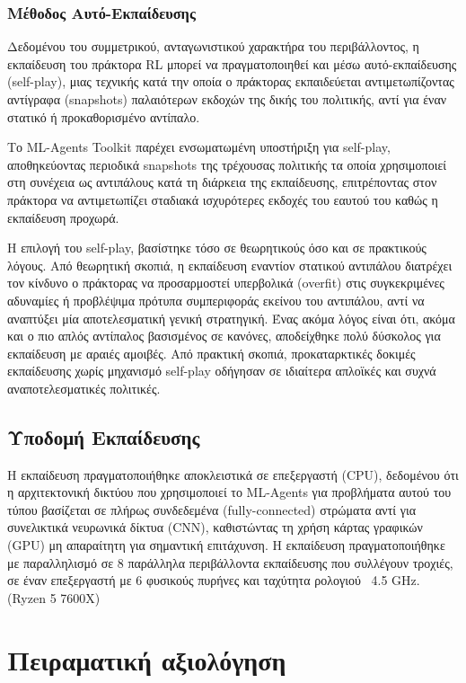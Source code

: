 \documentclass[12pt]{article}
\begin{document}
\subsubsection{Μέθοδος Αυτό-Εκπαίδευσης}
Δεδομένου του συμμετρικού, ανταγωνιστικού χαρακτήρα του περιβάλλοντος, η εκπαίδευση του πράκτορα RL μπορεί να πραγματοποιηθεί και μέσω αυτό-εκπαίδευσης (self-play), μιας τεχνικής κατά την οποία ο πράκτορας εκπαιδεύεται αντιμετωπίζοντας αντίγραφα (snapshots) παλαιότερων εκδοχών της δικής του πολιτικής, αντί για έναν στατικό ή προκαθορισμένο αντίπαλο. 

Το ML-Agents Toolkit παρέχει ενσωματωμένη υποστήριξη για self-play, αποθηκεύοντας περιοδικά snapshots της τρέχουσας πολιτικής τα οποία χρησιμοποιεί στη συνέχεια ως αντιπάλους κατά τη διάρκεια της εκπαίδευσης, επιτρέποντας στον πράκτορα να αντιμετωπίζει σταδιακά ισχυρότερες εκδοχές του εαυτού του καθώς η εκπαίδευση προχωρά.

Η επιλογή του self-play, βασίστηκε τόσο σε θεωρητικούς όσο και σε πρακτικούς λόγους. Από θεωρητική σκοπιά, η εκπαίδευση εναντίον στατικού αντιπάλου διατρέχει τον κίνδυνο ο πράκτορας να προσαρμοστεί υπερβολικά (overfit) στις συγκεκριμένες αδυναμίες ή προβλέψιμα πρότυπα συμπεριφοράς εκείνου του αντιπάλου, αντί να αναπτύξει μία αποτελεσματική γενική στρατηγική. Ένας ακόμα λόγος είναι ότι, ακόμα και ο πιο απλός αντίπαλος βασισμένος σε κανόνες, αποδείχθηκε πολύ δύσκολος για εκπαίδευση με αραιές αμοιβές. Από πρακτική σκοπιά, προκαταρκτικές δοκιμές εκπαίδευσης χωρίς μηχανισμό self-play οδήγησαν σε ιδιαίτερα απλοϊκές και συχνά αναποτελεσματικές πολιτικές.

\subsection{Υποδομή Εκπαίδευσης}
Η εκπαίδευση πραγματοποιήθηκε αποκλειστικά σε επεξεργαστή (CPU), δεδομένου ότι η αρχιτεκτονική δικτύου που χρησιμοποιεί το ML-Agents για προβλήματα αυτού του τύπου βασίζεται σε πλήρως συνδεδεμένα (fully-connected) στρώματα αντί για συνελικτικά νευρωνικά δίκτυα (CNN), καθιστώντας τη χρήση κάρτας γραφικών (GPU) μη απαραίτητη για σημαντική επιτάχυνση. Η εκπαίδευση πραγματοποιήθηκε με παραλληλισμό σε 8 παράλληλα περιβάλλοντα εκπαίδευσης που συλλέγουν τροχιές, σε έναν επεξεργαστή με 6 φυσικούς πυρήνες και ταχύτητα ρολογιού ~4.5 GHz. (\foreignlanguage{english}{Ryzen 5 7600X})

\section{Πειραματική αξιολόγηση}
\end{document}

